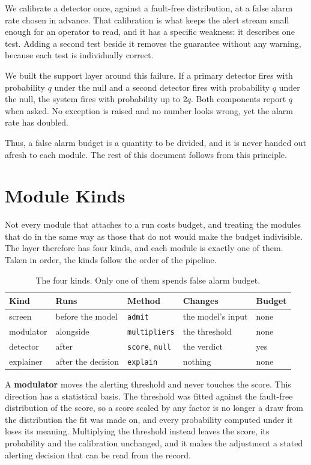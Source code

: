\documentclass{article}
\begin{document}
We calibrate a detector once, against a fault-free distribution, at a false
alarm rate chosen in advance. That calibration is what keeps the alert stream
small enough for an operator to read, and it has a specific weakness: it
describes one test. Adding a second test beside it removes the guarantee
without any warning, because each test is individually correct.

We built the support layer around this failure. If a primary detector fires
with probability $q$ under the null and a second detector fires with
probability $q$ under the null, the system fires with probability up to $2q$.
Both components report $q$ when asked. No exception is raised and no number
looks wrong, yet the alarm rate has doubled.

Thus, a false alarm budget is a quantity to be divided, and it is never handed
out afresh to each module. The rest of this document follows from this
principle.

\section{Module Kinds}
\label{sec:kinds}

Not every module that attaches to a run costs budget, and treating the modules
that do in the same way as those that do not would make the budget
indivisible. The layer therefore has four kinds, and each module is exactly one
of them. Taken in order, the kinds follow the order of the pipeline.

\begin{table}[t]
  \centering
  \caption{The four kinds. Only one of them spends false alarm budget.}
  \label{tab:kinds}
  \begin{tabular}{lllll}
    \toprule
    Kind & Runs & Method & Changes & Budget \\
    \midrule
    screen    & before the model & \texttt{admit}       & the model's input & none \\
    modulator & alongside        & \texttt{multipliers} & the threshold     & none \\
    detector  & after            & \texttt{score}, \texttt{null} & the verdict & yes \\
    explainer & after the decision & \texttt{explain}   & nothing           & none \\
    \bottomrule
  \end{tabular}
\end{table}

A \textbf{modulator} moves the alerting threshold and never touches the score.
This direction has a statistical basis. The threshold was fitted against the
fault-free distribution of the score, so a score scaled by any factor is no
longer a draw from the distribution the fit was made on, and every probability
computed under it loses its meaning. Multiplying the threshold instead leaves
the score, its probability and the calibration unchanged, and it makes the
adjustment a stated alerting decision that can be read from the record.
\end{document}
